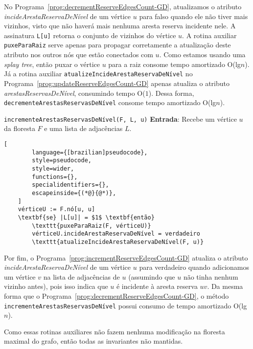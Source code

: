 No Programa~\ref{prog:decrementReserveEdgesCount-GD}, atualizamos o atributo \textit{incideArestaReservaDeNível} de um vértice $u$ para falso quando ele não tiver mais vizinhos, visto que não haverá mais nenhuma aresta reserva incidente nele. A assinatura \texttt{L[u]} retorna o conjunto de vizinhos do vértice $u$. A rotina auxiliar \texttt{puxeParaRaiz} serve apenas para propagar corretamente a atualização deste atributo nos outros nós que estão conectados com $u$. Como estamos usando uma \textit{splay tree}, então puxar o vértice $u$ para a raiz consome tempo amortizado O(lg$n$). Já a rotina auxiliar \texttt{atualizeIncideArestaReservaDeNível} no Programa~\ref{prog:updateReserveEdgesCount-GD} apenas atualiza o atributo \textit{arestasReservasDeNível}, consumindo tempo O($1$). Dessa forma, \texttt{decrementeArestasReservasDeNível} consome tempo amortizado O(lg$n$).

\newpage
\begin{programruledcaption}{\texttt{incrementeArestasReservasDeNível(F, L, u)} \label{prog:incrementReserveEdgesCount-GD}}
    \noindent\textbf{Entrada}: Recebe um vértice $u$ da floresta $F$ e uma lista de adjacências $L$.
    \vspace{-0.5\baselineskip}
    \begin{lstlisting}[
        language={[brazilian]pseudocode},
        style=pseudocode,
        style=wider,
        functions={},
        specialidentifiers={},
        escapeinside={(*@}{@*)},
    ]
    vérticeU := F.nó[u, u]
    \textbf{se} |L[u]| = $1$ \textbf{então} 
        \texttt{puxeParaRaiz(F, vérticeU)}
        vérticeU.incideArestaReservaDeNível = verdadeiro
        \texttt{atualizeIncideArestaReservaDeNível(F, u)}
    \end{lstlisting}
    \vspace{-0.5\baselineskip}
\end{programruledcaption}

Por fim, o Programa~\ref{prog:incrementReserveEdgesCount-GD} atualiza o atributo \textit{incideArestaReservaDeNível} de um vértice $u$ para verdadeiro quando adicionamos um vértice $v$ na lista de adjacências de $u$ (assumindo que $u$ não tinha nenhum vizinho antes), pois isso indica que $u$ é incidente à aresta reserva $uv$. Da mesma forma que o Programa~\ref{prog:decrementReserveEdgesCount-GD}, o método \texttt{incrementeArestasReservasDeNível} possui consumo de tempo amortizado O(lg$n$).

Como essas rotinas auxiliares não fazem nenhuma modificação na floresta maximal do grafo, então todas as invariantes não mantidas.

